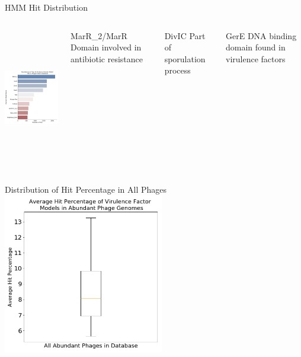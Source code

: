 \documentclass[11pt, xcolor=table]{beamer}
\begin{document}
	
	\begin{frame}{HMM Hit Distribution}
	\begin{columns}
	\includegraphics[height=6cm, width=6cm]{CPBS_11_18/TopDomains.jpg}
	\begin{block}{MarR\_2/MarR}
	Domain involved in antibiotic resistance
	\end{block}
	\begin{block}{DivIC}
	Part of sporulation process
	\end{block}
	\begin{block}{GerE}
	DNA binding domain found in virulence factors
	\end{block}
	\end{columns}
	\end{frame}
	
	\begin{frame}{Distribution of Hit Percentage in All Phages}
	\centering
	\includegraphics[height=7cm, width=7cm]{CPBS_11_18/AbundantPhageTotal.jpg}
	
	\end{frame}
	
\end{document}
